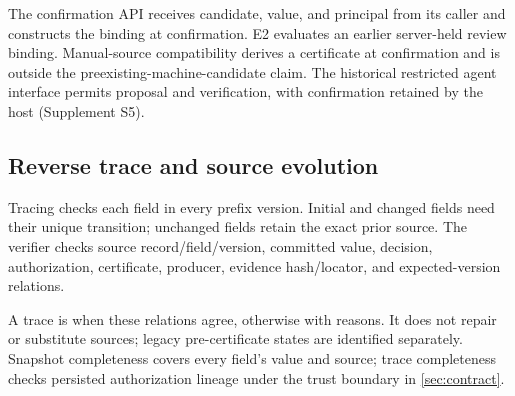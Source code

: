 The confirmation API receives candidate, value, and principal from its caller and constructs the binding at confirmation. E2 evaluates an earlier server-held review binding. Manual-source compatibility derives a certificate at confirmation and is outside the preexisting-machine-candidate claim. The historical restricted agent interface permits proposal and verification, with confirmation retained by the host (Supplement S5).

\subsection{Reverse trace and source evolution}

Tracing checks each field in every prefix version. Initial and changed fields need their unique transition; unchanged fields retain the exact prior source. The verifier checks source record/field/version, committed value, decision, authorization, certificate, producer, evidence hash/locator, and expected-version relations.

A trace is  when these relations agree, otherwise  with reasons. It does not repair or substitute sources; legacy pre-certificate states are identified separately. Snapshot completeness covers every field's value and source; trace completeness checks persisted authorization lineage under the trust boundary in \cref{sec:contract}.
